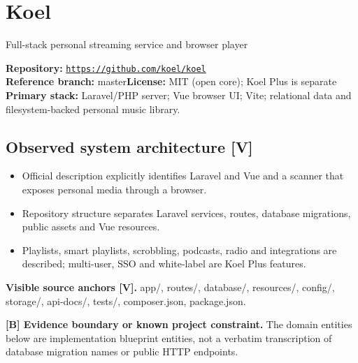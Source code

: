\documentclass[10pt,a4paper,oneside]{report}
\newcommand{\tagboundary}{\textbf{[B] Evidence boundary or known project constraint.}}
\newcommand{\sourceurl}[1]{\href{#1}{\texttt{\nolinkurl{#1}}}}
\begin{document}
\chapter{Koel}
{\large\color{muted}Full-stack personal streaming service and browser player}\par
\begin{evidencebox}\small\textbf{Repository:} \sourceurl{https://github.com/koel/koel}\\\textbf{Reference branch:} master\qquad \textbf{License:} MIT (open core); Koel Plus is separate\\\textbf{Primary stack:} Laravel/PHP server; Vue browser UI; Vite; relational data and filesystem-backed personal music library.\end{evidencebox}
\section{Observed system architecture [V]}
\begin{itemize}[leftmargin=*,itemsep=2pt,topsep=3pt]
\item Official description explicitly identifies Laravel and Vue and a scanner that exposes personal media through a browser.
\item Repository structure separates Laravel services, routes, database migrations, public assets and Vue resources.
\item Playlists, smart playlists, scrobbling, podcasts, radio and integrations are described; multi-user, SSO and white-label are Koel Plus features.
\end{itemize}
\textbf{Visible source anchors [V].} app/, routes/, database/, resources/, config/, storage/, api-docs/, tests/, composer.json, package.json.\par
\begin{evidencebox}\tagboundary{} The domain entities below are implementation blueprint entities, not a verbatim transcription of database migration names or public HTTP endpoints.\end{evidencebox}
\end{document}
